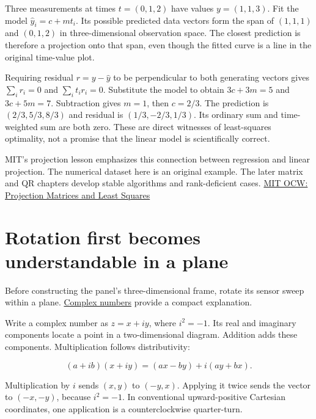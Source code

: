 Three measurements at times \(t=(0,1,2)\) have values \(y=(1,1,3)\). Fit the model \(\widehat y_i=c+mt_i\). Its possible predicted data vectors form the span of \((1,1,1)\) and \((0,1,2)\) in three-dimensional observation space. The closest prediction is therefore a projection onto that span, even though the fitted curve is a line in the original time-value plot.

Requiring residual \(r=y-\widehat y\) to be perpendicular to both generating vectors gives \(\sum_i r_i=0\) and \(\sum_i t_ir_i=0\). Substitute the model to obtain \(3c+3m=5\) and \(3c+5m=7\). Subtraction gives \(m=1\), then \(c=2/3\). The prediction is \((2/3,5/3,8/3)\) and residual is \((1/3,-2/3,1/3)\). Its ordinary sum and time-weighted sum are both zero. These are direct witnesses of least-squares optimality, not a promise that the linear model is scientifically correct.

MIT's projection lesson emphasizes this connection between regression and linear projection. The numerical dataset here is an original example. The later matrix and QR chapters develop stable algorithms and rank-deficient cases. \href{https://www.ocw.mit.edu/courses/18-06sc-linear-algebra-fall-2011/pages/least-squares-determinants-and-eigenvalues/projection-matrices-and-least-squares/}{MIT OCW: Projection Matrices and Least Squares}

\section{Rotation first becomes understandable in a plane}\label{01-foundations-i-ch017-rotation-first-becomes-understandable-in-a-plane}

Before constructing the panel's three-dimensional frame, rotate its sensor sweep within a plane. \hyperref[01-foundations-i-ch017-rotation-first-becomes-understandable-in-a-plane]{Complex numbers} provide a compact explanation.

Write a complex number as \(z=x+iy\), where \(i^2=-1\). Its real and imaginary components locate a point in a two-dimensional diagram. Addition adds these components. Multiplication follows distributivity:

\[
(a+ib)(x+iy)=(ax-by)+i(ay+bx).
\]

Multiplication by \(i\) sends \((x,y)\) to \((-y,x)\). Applying it twice sends the vector to \((-x,-y)\), because \(i^2=-1\). In conventional upward-positive Cartesian coordinates, one application is a counterclockwise quarter-turn.

